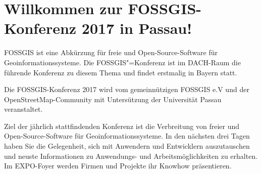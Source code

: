 \newpage
\section*{Willkommen zur FOSSGIS-Konferenz 2017 in Passau!} \label{welcome}
FOSSGIS ist eine Abkürzung für freie und Open-Source-Software für Geoinformationssysteme.
Die FOSSGIS"=Konferenz ist im DACH-Raum die führende Konferenz zu diesem Thema und findet erstmalig
in Bayern statt.

Die FOSSGIS-Konferenz 2017 wird vom gemeinnützigen FOSSGIS e.V und der OpenStreetMap-Community
mit Untersützung der Universität Passau veranstaltet.

Ziel der jährlich stattfindenden Konferenz ist die Verbreitung von freier und Open-Source-Software
für Geoinformationssysteme.  In den nächsten drei Tagen haben Sie die Gelegenheit, sich mit
Anwendern und Entwicklern auszutauschen
und neuste Informationen zu An\-wen\-dungs- und Arbeitsmöglichkeiten zu erhalten. Im EXPO-Foyer
werden Firmen und Projekte ihr Know\-how präsentieren.

\newpage

